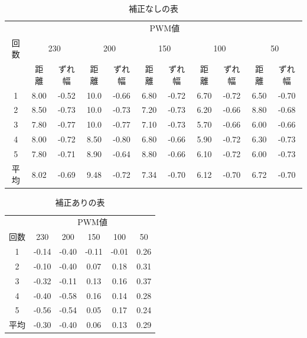 \documentclass[12pt,oneside]{sotsuken_paper}
\begin{document}
		\begin{table}[htb]
			\begin{center}
				\caption{補正なしの表}
				\label{1}
				\begin{tabular}{|c|c|c|c|c|c|c|c|c|c|c|} \hline
					& \multicolumn{10}{c|}{PWM値} \\ \cline{2-11}
					回数 & \multicolumn{2}{c|}{230}
					& \multicolumn{2}{c|}{200}
					& \multicolumn{2}{c|}{150}
					& \multicolumn{2}{c|}{100}
					& \multicolumn{2}{c|}{50} \\ \cline{2-11}
					& 距離 & ずれ幅 & 距離 & ずれ幅 & 距離 & ずれ幅 & 距離 & ずれ幅 & 距離 & ずれ幅 \\ \hline
					1 & 8.00 & -0.52 & 10.0 & -0.66 & 6.80 & -0.72 & 6.70 & -0.72 & 6.50 & -0.70 \\
					2 & 8.50 & -0.73 & 10.0 & -0.73 & 7.20 & -0.73 & 6.20 & -0.66 & 8.80 & -0.68 \\
					3 & 7.80 & -0.77 & 10.0 & -0.77 & 7.10 & -0.73 & 5.70 & -0.66 & 6.00 & -0.66 \\
					4 & 8.00 & -0.72 & 8.50 & -0.80 & 6.80 & -0.66 & 5.90 & -0.72 & 6.30 & -0.73 \\
					5 & 7.80 & -0.71 & 8.90 & -0.64 & 8.80 & -0.66 & 6.10 & -0.72 & 6.00 & -0.73 \\ \hline
					平均 & 8.02 & -0.69 & 9.48 & -0.72 & 7.34 & -0.70 & 6.12 & -0.70 & 6.72 & -0.70 \\ \hline
				\end{tabular}
			\end{center}
		\end{table}

		\begin{table}[htb]
			\begin{center}
				\caption{補正ありの表}
				\label{2}
				\begin{tabular}{|c|c|c|c|c|c|} \hline
					& \multicolumn{5}{c|}{PWM値} \\ \cline{2-6}
					回数 & 230 & 200 & 150 & 100 & 50 \\ \hline
					1 & -0.14 & -0.40 & -0.11 & -0.01 & 0.26 \\
					2 & -0.10 & -0.40 & 0.07 & 0.18 & 0.31 \\
					3 & -0.32 & -0.11 & 0.13 & 0.16 & 0.37 \\
					4 & -0.40 & -0.58 & 0.16 & 0.14 & 0.28 \\
					5 & -0.56 & -0.54 & 0.05 & 0.17 & 0.24 \\ \hline
					平均 & -0.30 & -0.40 & 0.06 & 0.13 & 0.29 \\ \hline
				\end{tabular}
			\end{center}
		\end{table}
\end{document}
